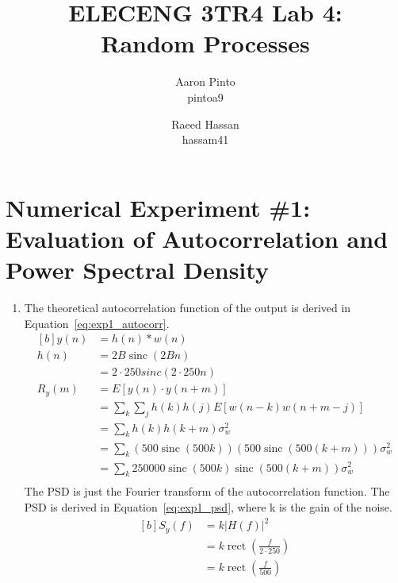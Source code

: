 \documentclass[12pt]{article}
\title{ELECENG 3TR4 Lab 4: \\ Random Processes}
\author{
    Aaron Pinto \\ pintoa9
    \and
    Raeed Hassan \\ hassam41
}
\DeclareMathOperator{\sinc}{sinc}
\DeclareMathOperator{\rect}{rect}
\begin{document}
\maketitle
\clearpage

\section*{Numerical Experiment \#1: Evaluation of Autocorrelation and Power Spectral Density}

\begin{enumerate}[label=\roman*)]
	\item %
	The theoretical autocorrelation function of the output is derived in Equation~\ref{eq:exp1_autocorr}.
	\begin{equation} \label{eq:exp1_autocorr}
	\begin{aligned}[b]
			y(n) &= h(n)\ast w(n) \\
			h(n) &= 2B\sinc(2Bn) \\
			&= 2\cdot 250sinc(2\cdot 250 n) \\
			R_y(m) &= E\left[y(n)\cdot y(n+m)\right] \\
			&= \sum_k\sum_j h(k)h(j)E[w(n-k)w(n+m-j)] \\
			&= \sum_k h(k)h(k+m)\sigma_w^2 \\
			&= \sum_k (500\sinc(500k))(500\sinc(500(k+m)))\sigma_w^2 \\
			&= \sum_k 250000\sinc(500k)\sinc(500(k+m))\sigma_w^2 \\
	\end{aligned}
	\end{equation}
	The PSD is just the Fourier transform of the autocorrelation function. The PSD is derived in Equation~\ref{eq:exp1_psd}, where k is the gain of the noise.
	\begin{equation} \label{eq:exp1_psd}
	\begin{aligned}[b]
			S_y(f) &= k \left | H(f) \right |^2 \\
			&= k \rect(\frac{f}{2\cdot 250}) \\
			&= k \rect(\frac{f}{500}) \\
	\end{aligned}
	\end{equation}


\end{enumerate}
\end{document}
